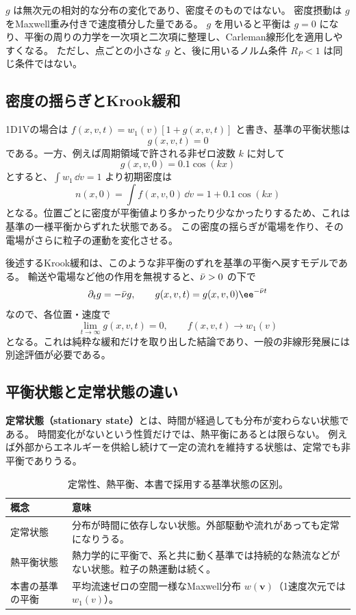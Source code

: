 $g$ は無次元の相対的な分布の変化であり、密度そのものではない。
密度摂動は $g$ をMaxwell重み付きで速度積分した量である。
$g$ を用いると平衡は $g=0$ になり、平衡の周りの力学を一次項と二次項に整理し、Carleman線形化を適用しやすくなる。
ただし、点ごとの小さな $g$ と、後に用いるノルム条件 $R_P<1$ は同じ条件ではない。

\subsection{密度の揺らぎとKrook緩和}
1D1Vの場合は $f(x,v,t)=w_1(v)[1+g(x,v,t)]$ と書き、基準の平衡状態は
\[
\boxed{g(x,v,t)=0}
\]
である。一方、例えば周期領域で許される非ゼロ波数 $k$ に対して
\[
g(x,v,0)=0.1\cos(kx)
\]
とすると、$\int w_1\,\dd v=1$ より初期密度は
\[
n(x,0)=\int f(x,v,0)\,\dd v=1+0.1\cos(kx)
\]
となる。位置ごとに密度が平衡値より多かったり少なかったりするため、これは基準の一様平衡からずれた状態である。
この密度の揺らぎが電場を作り、その電場がさらに粒子の運動を変化させる。

後述するKrook緩和は、このような非平衡のずれを基準の平衡へ戻すモデルである。
輸送や電場など他の作用を無視すると、$\bar\nu>0$ の下で
\[
\partial_tg=-\nuu g,\qquad g(x,v,t)=g(x,v,0)\ee^{-\nuu t}
\]
なので、各位置・速度で
\[
\lim_{t\to\infty}g(x,v,t)=0,\qquad f(x,v,t)\longrightarrow w_1(v)
\]
となる。これは純粋な緩和だけを取り出した結論であり、一般の非線形発展には別途評価が必要である。

\subsection{平衡状態と定常状態の違い}
\textbf{定常状態（stationary state）}とは、時間が経過しても分布が変わらない状態である。
時間変化がないという性質だけでは、熱平衡にあるとは限らない。
例えば外部からエネルギーを供給し続けて一定の流れを維持する状態は、定常でも非平衡でありうる。

\begin{table}[htbp]
\centering\small
\caption{定常性、熱平衡、本書で採用する基準状態の区別。}
\begin{tabularx}{\textwidth}{lX}
\toprule 概念 & 意味 \\\midrule
定常状態 & 分布が時間に依存しない状態。外部駆動や流れがあっても定常になりうる。\\
熱平衡状態 & 熱力学的に平衡で、系と共に動く基準では持続的な熱流などがない状態。粒子の熱運動は続く。\\
本書の基準の平衡 & 平均流速ゼロの空間一様なMaxwell分布 $w(\bm v)$（1速度次元では $w_1(v)$）。\\
\bottomrule
\end{tabularx}
\end{table}

